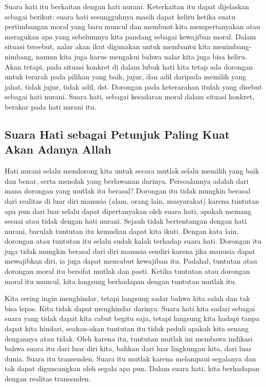\documentclass[11pt,twoside,a5paper,openany]{memoir}
\begin{document}
Suara hati itu berkaitan dengan hati nurani. Keterkaitan itu dapat
dijelaskan sebagai berikut: suara hati sesungguhnya masih dapat keliru
ketika suatu pertimbangan moral yang baru muncul dan membuat kita
mempertanyakan atau meragukan apa yang sebelumnya kita pandang sebagai
kewajiban moral. Dalam situasi tersebut, nalar akan ikut digunakan untuk
membantu kita menimbang-nimbang, namun kita juga harus mengakui bahwa
nalar kita juga bisa keliru. Akan tetapi, pada situasi konkret di dalam
lubuk hati kita tetap ada dorongan untuk terarah pada pilihan yang baik,
jujur, dan adil daripada memilih yang jahat, tidak jujur, tidak adil,
dst. Dorongan pada keterarahan itulah yang disebut sebagai hati nurani.
Suara hati, sebagai kesadaran moral dalam situasi konkret, berakar pada
hati nurani itu.

\hypertarget{suara-hati-sebagai-petunjuk-paling-kuat-akan-adanya-allah}{%
\subsection{Suara Hati sebagai Petunjuk Paling Kuat Akan Adanya
Allah}\label{suara-hati-sebagai-petunjuk-paling-kuat-akan-adanya-allah}}

Hati nurani selalu mendorong kita untuk secara mutlak selalu memilih
yang baik dan benar, serta menolak yang berlawanan darinya. Persoalannya
adalah dari mana dorongan yang mutlak itu berasal? Dorongan itu tidak
mungkin berasal dari realitas di luar diri manusia (alam, orang lain,
masyarakat) karena tuntutan apa pun dari luar selalu dapat dipertanyakan
oleh suara hati, apakah memang sesuai atau tidak dengan hati nurani.
Sejauh tidak bertentangan dengan hati nurani, barulah tuntutan itu
kemudian dapat kita ikuti. Dengan kata lain, dorongan atau tuntutan itu
selalu sudah kalah terhadap suara hati. Dorongan itu juga tidak mungkin
berasal dari diri manusia sendiri karena jika manusia dapat mewajibkan
diri, ia juga dapat mencabut kewajiban itu. Padahal, tuntutan atau
dorongan moral itu bersifat mutlak dan pasti. Ketika tuntutan atau
dorongan moral itu muncul, kita langsung berhadapan dengan tuntutan
mutlak itu.

Kita sering ingin menghindar, tetapi langsung sadar bahwa kita salah dan
tak bisa lepas. Kita tidak dapat menghindar darinya. Suara hati kita
sadari sebagai suara yang tidak dapat kita cabut begitu saja, tetapi
langsung kita hadapi tanpa dapat kita hindari, seakan-akan tuntutan itu
tidak peduli apakah kita senang dengannya atau tidak. Oleh karena itu,
tuntutan mutlak ini membawa indikasi bahwa suara itu dari luar diri
kita, bahkan dari luar lingkungan kita, dari luar dunia. Suara itu
transenden. Suara itu mutlak karena melampaui segalanya dan tak dapat
diguncangkan oleh segala apa pun. Dalam suara hati, kita berhadapan
dengan realitas transenden.
\end{document}
